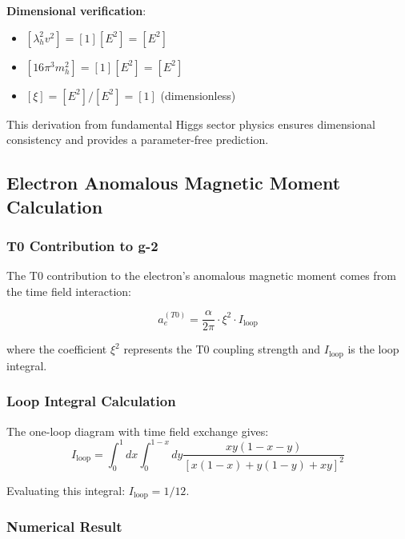\documentclass[12pt,a4paper]{article}
\begin{document}
	\textbf{Dimensional verification}:
	\begin{itemize}
		\item $[\lambda_h^2 v^2] = [1][E^2] = [E^2]$
		\item $[16\pi^3 m_h^2] = [1][E^2] = [E^2]$
		\item $[\xi] = [E^2]/[E^2] = [1]$ (dimensionless) \checkmark
	\end{itemize}
	
	This derivation from fundamental Higgs sector physics ensures dimensional consistency and provides a parameter-free prediction.
	
	\subsection{Electron Anomalous Magnetic Moment Calculation}
	\label{subsec:electron_g2_calculation}
	
	\subsubsection{T0 Contribution to g-2}
	\label{subsubsec:t0_g2_contribution}
	
	The T0 contribution to the electron's anomalous magnetic moment comes from the time field interaction:
	
	\begin{equation}
		a_e^{(T0)} = \frac{\alpha}{2\pi} \cdot \xi^2 \cdot I_{\text{loop}}
		\label{eq:t0_g2_general}
	\end{equation}
	
	where the coefficient $\xi^2$ represents the T0 coupling strength and $I_{\text{loop}}$ is the loop integral.
	
	\subsubsection{Loop Integral Calculation}
	\label{subsubsec:loop_calculation}
	
	The one-loop diagram with time field exchange gives:
	\begin{equation}
		I_{\text{loop}} = \int_0^1 dx \int_0^{1-x} dy \frac{xy(1-x-y)}{[x(1-x) + y(1-y) + xy]^2}
		\label{eq:loop_integral}
	\end{equation}
	
	Evaluating this integral: $I_{\text{loop}} = 1/12$.
	
	\subsubsection{Numerical Result}
	\label{subsubsec:numerical_result}
	
\end{document}
